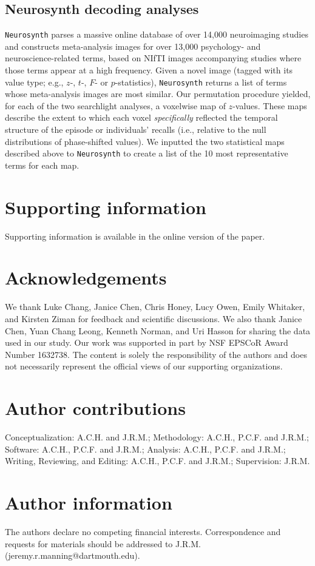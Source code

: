 \documentclass[10pt]{article}
\begin{document}
\subsection*{Neurosynth decoding analyses}
\texttt{Neurosynth} parses a massive online database of over 14,000 neuroimaging studies and constructs meta-analysis images for over 13,000 psychology- and neuroscience-related terms, based on NIfTI images accompanying studies where those terms appear at a high frequency.  Given a novel image (tagged with its value type; e.g., $z$-, $t$-, $F$- or $p$-statistics), \texttt{Neurosynth} returns a list of terms whose meta-analysis images are most similar.  Our permutation procedure yielded, for each of the two searchlight analyses, a voxelwise map of $z$-values.  These maps describe the extent to which each voxel \textit{specifically} reflected the temporal structure of the episode or individuals' recalls (i.e., relative to the null distributions of phase-shifted values). We inputted the two statistical maps described above to \texttt{Neurosynth} to create a list of the 10 most representative terms for each map.


% 


\section*{Supporting information}
Supporting information is available in the online version of the paper.

\section*{Acknowledgements}
We thank Luke Chang, Janice Chen, Chris Honey, Lucy Owen, Emily Whitaker, and Kirsten Ziman for feedback and scientific discussions. We also thank Janice Chen, Yuan Chang Leong, Kenneth Norman, and Uri Hasson for sharing the data used in our study.  Our work was supported in part by NSF EPSCoR Award Number 1632738. The content is solely the responsibility of the authors and does not necessarily represent the official views of our supporting organizations.

\section*{Author contributions}
Conceptualization: A.C.H. and J.R.M.; Methodology: A.C.H., P.C.F. and J.R.M.; Software: A.C.H., P.C.F. and J.R.M.; Analysis: A.C.H., P.C.F. and J.R.M.; Writing, Reviewing, and Editing: A.C.H., P.C.F. and J.R.M.; Supervision: J.R.M.

\section*{Author information}
The authors declare no competing financial interests.  Correspondence and requests for materials should be addressed to J.R.M. (jeremy.r.manning@dartmouth.edu).
\end{document}
